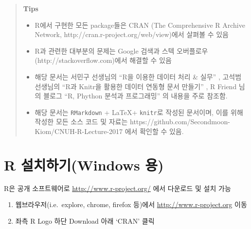 \documentclass[12pt,a4paper]{book}
\providecommand{\tightlist}{%
  \setlength{\itemsep}{0pt}\setlength{\parskip}{0pt}}
\newcommand{\latex}{\LaTeX\xspace}
\theoremstyle{definition}
\theoremstyle{definition}
\theoremstyle{definition}
\theoremstyle{remark}
\begin{document}
\begin{quote}
\colorbox{gray!10}{\begin{minipage}{15cm}
\textbf{Tips}
  \begin{itemize}
    \item R에서 구현한 모든 package들은 CRAN (The Comprehensive R Archive Network, http://cran.r-project.org/web/view)에서 살펴볼 수 있음
    \item R과 관련한 대부분의 문제는 Google 검색과 스텍 오버플로우(http://stackoverflow.com)에서 해결할 수 있음
    \item 해당 문서는 서민구 선생님의 ``R을 이용한 데이터 처리 \& 실무'' \citep{Seo-2014}, 고석범 선생님의 ``R과 Knitr을 활용한 데이터 연동형 문서 만들기'' \citep{Ko-2014}, R Friend 님의 블로그 ``R, Phython 분석과 프로그래밍'' \citep{R-Friend} 의 내용을 주로 참조함. 
    \item 해당 문서는 \texttt{RMarkdown} + \latex + \texttt{knitr}로 작성된 문서이며, 이를 위해 작성한 모든 소스 코드 및 자료는 https://github.com/Secondmoon-Kiom/CNUH-R-Lecture-2017 에서 확인할 수 있음. 
  \end{itemize}
\end{minipage}}
\end{quote}

\newpage

\section{R 설치하기(Windows 용)}\label{r-windows-}

R은 공개 소프트웨어로 \url{http://www.r-project.org/} 에서 다운로드 및
설치 가능

\begin{enumerate}
\def\labelenumi{\arabic{enumi}.}
\tightlist
\item
  웹브라우저(i.e.~explore, chrome, firefox 등)에서
  \url{http://www.r-project.org} 이동
\item
  좌측 R Logo 하단 Download 아래 `CRAN' 클릭
\end{enumerate}
\end{document}
